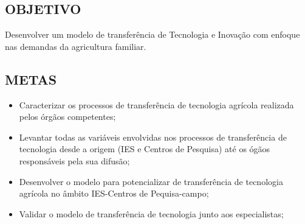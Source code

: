 \subsection{OBJETIVO}
Desenvolver um modelo de transferência de Tecnologia e Inovação com enfoque nas demandas da agricultura familiar.

\subsection{METAS}

\begin{itemize}
\item{Caracterizar os processos de transferência de tecnologia agrícola realizada pelos órgãos competentes;}
\item {Levantar todas as variáveis envolvidas nos processos de transferência de tecnologia desde a  origem (IES e Centros de Pesquisa) até os ógãos responsáveis pela sua difusão;}
\item {Desenvolver o modelo para potencializar de transferência de tecnologia agrícola no âmbito IES-Centros de Pequisa-campo;}
\item {Validar o modelo de transferência de tecnologia junto aos especialistas;}
\end{itemize}






